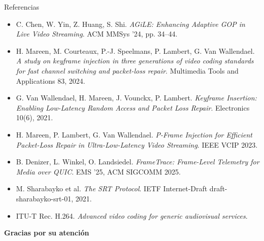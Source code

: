 \documentclass[aspectratio=169, 12pt]{beamer}
\begin{document}
\begin{frame}{Referencias}
    \scriptsize
    \begin{itemize}
        \item[{[1]}] C. Chen, W. Yin, Z. Huang, S. Shi. \emph{AGiLE: Enhancing Adaptive GOP in Live Video Streaming}. ACM MMSys '24, pp. 34--44.
        \item[{[2]}] H. Mareen, M. Courteaux, P.-J. Speelmans, P. Lambert, G. Van Wallendael. \emph{A study on keyframe injection in three generations of video coding standards for fast channel switching and packet-loss repair}. Multimedia Tools and Applications 83, 2024.
        \item[{[3]}] G. Van Wallendael, H. Mareen, J. Vounckx, P. Lambert. \emph{Keyframe Insertion: Enabling Low-Latency Random Access and Packet Loss Repair}. Electronics 10(6), 2021.
        \item[{[4]}] H. Mareen, P. Lambert, G. Van Wallendael. \emph{P-Frame Injection for Efficient Packet-Loss Repair in Ultra-Low-Latency Video Streaming}. IEEE VCIP 2023.
        \item[{[5]}] B. Denizer, L. Winkel, O. Landsiedel. \emph{FrameTrace: Frame-Level Telemetry for Media over QUIC}. EMS '25, ACM SIGCOMM 2025.
        \item[{[6]}] M. Sharabayko et al. \emph{The SRT Protocol}. IETF Internet-Draft draft-sharabayko-srt-01, 2021.
        \item[{[7]}] ITU-T Rec. H.264. \emph{Advanced video coding for generic audiovisual services}.
    \end{itemize}
\end{frame}

\begin{frame}
    \centering
    \Huge \textcolor{SentricaBlue}{\textbf{Gracias por su atención}}
\end{frame}
\end{document}
